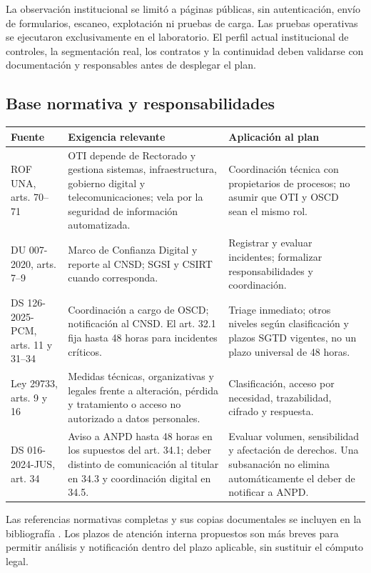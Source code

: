 \documentclass[10pt,a4paper]{article}
\newcommand{\cabecera}[1]{\textbf{#1}}
\begin{document}
La observación institucional se limitó a páginas públicas, sin autenticación, envío de formularios, escaneo, explotación ni pruebas de carga. Las pruebas operativas se ejecutaron exclusivamente en el laboratorio. El perfil actual institucional de controles, la segmentación real, los contratos y la continuidad deben validarse con documentación y responsables antes de desplegar el plan.

\subsection{Base normativa y responsabilidades}
\begin{TablaCompacta}
\begin{longtable}{P{38mm}P{70mm}P{51mm}}
\toprule\cabecera{Fuente} & \cabecera{Exigencia relevante} & \cabecera{Aplicación al plan}\\\midrule\endhead
ROF UNA, arts. 70--71 & OTI depende de Rectorado y gestiona sistemas, infraestructura, gobierno digital y telecomunicaciones; vela por la seguridad de información automatizada. & Coordinación técnica con propietarios de procesos; no asumir que OTI y OSCD sean el mismo rol.\\
DU 007-2020, arts. 7--9 & Marco de Confianza Digital y reporte al CNSD; SGSI y CSIRT cuando corresponda. & Registrar y evaluar incidentes; formalizar responsabilidades y coordinación.\\
DS 126-2025-PCM, arts. 11 y 31--34 & Coordinación a cargo de OSCD; notificación al CNSD. El art. 32.1 fija hasta 48 horas para incidentes críticos. & Triage inmediato; otros niveles según clasificación y plazos SGTD vigentes, no un plazo universal de 48 horas.\\
Ley 29733, arts. 9 y 16 & Medidas técnicas, organizativas y legales frente a alteración, pérdida y tratamiento o acceso no autorizado a datos personales. & Clasificación, acceso por necesidad, trazabilidad, cifrado y respuesta.\\
DS 016-2024-JUS, art. 34 & Aviso a ANPD hasta 48 horas en los supuestos del art. 34.1; deber distinto de comunicación al titular en 34.3 y coordinación digital en 34.5. & Evaluar volumen, sensibilidad y afectación de derechos. Una subsanación no elimina automáticamente el deber de notificar a ANPD.\\\bottomrule
\end{longtable}
\end{TablaCompacta}
Las referencias normativas completas y sus copias documentales se incluyen en la bibliografía \cite{R14,R15,R16,R17}. Los plazos de atención interna propuestos son más breves para permitir análisis y notificación dentro del plazo aplicable, sin sustituir el cómputo legal.
\end{document}
